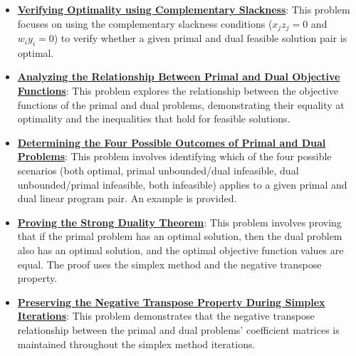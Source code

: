 \documentclass{article}%
\begin{document}
\begin{itemize}[leftmargin=*]%
\item \href{https://www.math.purdue.edu/~yipn/421/2024-09-12-Duality.pdf#page=21}{\textbf{Verifying Optimality using Complementary Slackness}}: This problem focuses on using the complementary slackness conditions ($x_j z_j = 0$ and $w_i y_i = 0$) to verify whether a given primal and dual feasible solution pair is optimal.%
\item \href{https://www.math.purdue.edu/~yipn/421/2024-09-12-Duality.pdf#page=22}{\textbf{Analyzing the Relationship Between Primal and Dual Objective Functions}}: This problem explores the relationship between the objective functions of the primal and dual problems, demonstrating their equality at optimality and the inequalities that hold for feasible solutions.%
\item \href{https://www.math.purdue.edu/~yipn/421/2024-09-12-Duality.pdf#page=18}{\textbf{Determining the Four Possible Outcomes of Primal and Dual Problems}}: This problem involves identifying which of the four possible scenarios (both optimal, primal unbounded/dual infeasible, dual unbounded/primal infeasible, both infeasible) applies to a given primal and dual linear program pair. An example is provided.%
\item \href{https://www.math.purdue.edu/~yipn/421/2024-09-12-Duality.pdf#page=11}{\textbf{Proving the Strong Duality Theorem}}: This problem involves proving that if the primal problem has an optimal solution, then the dual problem also has an optimal solution, and the optimal objective function values are equal. The proof uses the simplex method and the negative transpose property.%
\item \href{https://www.math.purdue.edu/~yipn/421/2024-09-12-Duality.pdf#page=6}{\textbf{Preserving the Negative Transpose Property During Simplex Iterations}}: This problem demonstrates that the negative transpose relationship between the primal and dual problems' coefficient matrices is maintained throughout the simplex method iterations.%
\end{itemize}%
\end{document}
